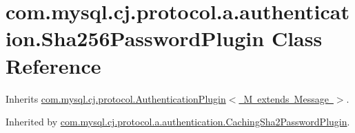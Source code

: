 \hypertarget{classcom_1_1mysql_1_1cj_1_1protocol_1_1a_1_1authentication_1_1_sha256_password_plugin}{}\section{com.\+mysql.\+cj.\+protocol.\+a.\+authentication.\+Sha256\+Password\+Plugin Class Reference}
\label{classcom_1_1mysql_1_1cj_1_1protocol_1_1a_1_1authentication_1_1_sha256_password_plugin}


Inherits \mbox{\hyperlink{interfacecom_1_1mysql_1_1cj_1_1protocol_1_1_authentication_plugin}{com.\+mysql.\+cj.\+protocol.\+Authentication\+Plugin$<$ M extends Message $>$}}.



Inherited by \mbox{\hyperlink{classcom_1_1mysql_1_1cj_1_1protocol_1_1a_1_1authentication_1_1_caching_sha2_password_plugin}{com.\+mysql.\+cj.\+protocol.\+a.\+authentication.\+Caching\+Sha2\+Password\+Plugin}}.

